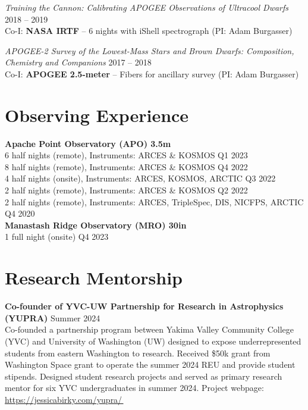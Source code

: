 \documentclass[a4,11pt]{article}
\let\orighref\href
\renewcommand{\href}[2]{\orighref{#1}{#2\,\scriptsize\faExternalLink}}
\begin{document}
\textsl{Training the Cannon: Calibrating APOGEE Observations of Ultracool Dwarfs} \hfill 2018 -- 2019 \\ 
Co-I: \textbf{NASA IRTF} -- 6 nights with iShell spectrograph (PI: Adam Burgasser) \vspace{.2cm} 

\textsl{APOGEE-2 Survey of the Lowest-Mass Stars and Brown Dwarfs: Composition, Chemistry and Companions} \hfill 2017 -- 2018 \\
Co-I: \textbf{APOGEE 2.5-meter} -- Fibers for ancillary survey (PI: Adam Burgasser) 

\section{Observing Experience}
\textbf{Apache Point Observatory (APO) 3.5m}  \\
6 half nights (remote), Instruments: ARCES \& KOSMOS \hfill Q1 2023 \\
8 half nights (remote), Instruments: ARCES \& KOSMOS \hfill Q4 2022 \\
4 half nights (onsite), Instruments: ARCES, KOSMOS, ARCTIC \hfill Q3 2022 \\
2 half nights (remote), Instruments: ARCES \& KOSMOS \hfill Q2 2022 \\
2 half nights (remote), Instruments: ARCES, TripleSpec, DIS, NICFPS, ARCTIC \hfill Q4 2020 \\

\vspace{.2cm}
\textbf{Manastash Ridge Observatory (MRO) 30in} \\
1 full night (onsite) \hfill Q4 2023


\section{Research Mentorship}

\textbf{Co-founder of YVC-UW Partnership for Research in Astrophysics (YUPRA)} \hfill Summer 2024 \\
\vspace{.1cm}
Co-founded a partnership program between Yakima Valley Community College (YVC) and University of Washington (UW) designed to expose underrepresented students from eastern Washington to research. Received \$50k grant from Washington Space grant to operate the summer 2024 REU and provide student stipends. Designed student research projects and served as primary research mentor for six YVC undergraduates in summer 2024. Project webpage: \href{https://jessicabirky.com/yupra/}{https://jessicabirky.com/yupra/}  \\
\end{document}
